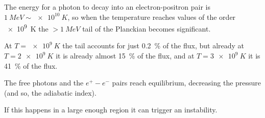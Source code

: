 \documentclass[main.tex]{subfiles}
\begin{document}
The energy for a photon to decay into an electron-positron pair is \(\SI{1}{MeV} \sim \SI{e10}{K}\), so when the temperature reaches values of the order \SI{e9}{K} the \(>\SI{1}{MeV}\) tail of the Planckian becomes significant.

At \(T = \SI{e9}{K}\) the tail accounts for just \SI{.2}{\percent} of the flux, but already at \(T = \SI{2e9}{K}\) it is already almost \SI{15}{\percent} of the flux, and at \(T = \SI{3e9}{K}\) it is \SI{41}{\percent} of the flux.

The free photons and the \(e^{+} - e^{-}\) pairs reach equilibrium, decreasing the pressure (and so, the adiabatic index).

If this happens in a large enough region it can trigger an instability.
\end{document}
